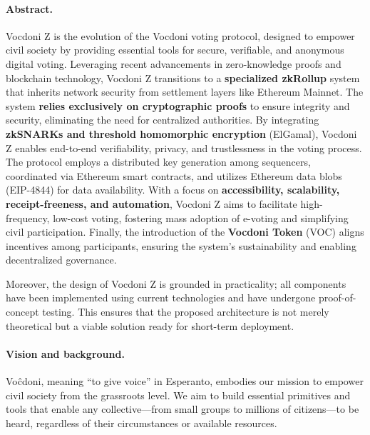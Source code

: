 

\paragraph{Abstract.} Vocdoni Z is the evolution of the Vocdoni voting protocol, designed to empower civil society by providing essential tools for secure, verifiable, and anonymous digital voting. Leveraging recent advancements in zero-knowledge proofs and blockchain technology, Vocdoni Z transitions to a \textbf{specialized zkRollup} system that inherits network security from settlement layers like Ethereum Mainnet. The system \textbf{relies exclusively on cryptographic proofs} to ensure integrity and security, eliminating the need for centralized authorities. By integrating \textbf{zkSNARKs and threshold homomorphic encryption} (ElGamal), Vocdoni Z enables end-to-end verifiability, privacy, and trustlessness in the voting process. The protocol employs a distributed key generation among sequencers, coordinated via Ethereum smart contracts, and utilizes Ethereum data blobs (EIP-4844) for data availability. With a focus on \textbf{accessibility, scalability, receipt-freeness, and automation}, Vocdoni Z aims to facilitate high-frequency, low-cost voting, fostering mass adoption of e-voting and simplifying civil participation. Finally, the introduction of the \textbf{Vocdoni Token} (VOC) aligns incentives among participants, ensuring the system's sustainability and enabling decentralized governance.

Moreover, the design of Vocdoni Z is grounded in practicality; all components have been implemented using current technologies and have undergone proof-of-concept testing. This ensures that the proposed architecture is not merely theoretical but a viable solution ready for short-term deployment.

\paragraph{Vision and background.}

Voĉdoni, meaning “to give voice” in Esperanto, embodies our mission to empower civil society from the grassroots level. We aim to build essential primitives and tools that enable any collective—from small groups to millions of citizens—to be heard, regardless of their circumstances or available resources.


